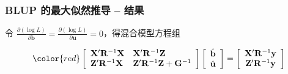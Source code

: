 \documentclass[serif,aspectratio=169]{beamer}
\begin{document}
\begin{frame}
  \frametitle{BLUP 的最大似然推导 -- 结果}
  令 $\displaystyle\frac{\partial(\log L)}{\partial\mathbf{b}}=\frac{\partial(\log L)}{\partial\mathbf{u}}=0$，得混合模型方程组

  \vspace{2em}
  
  $$
  \color{red}\left[\begin{array}{ll}
      \mathbf{X}'\mathbf{R}^{-1}\mathbf{X} & \mathbf{X}'\mathbf{R}^{-1}\mathbf{Z}\\
      \mathbf{Z}'\mathbf{R}^{-1}\mathbf{X} & \mathbf{Z}'\mathbf{R}^{-1}\mathbf{Z}+\mathbf{G}^{-1}
    \end{array}\right]
  \left[\begin{array}{cc}
      \hat{\mathbf{b}}\\
      \hat{\mathbf{u}}
    \end{array}\right] = 
  \left[\begin{array}{c}
      \mathbf{X}'\mathbf{R}^{-1}\mathbf{y}\\
      \mathbf{Z}'\mathbf{R}^{-1}\mathbf{y}
    \end{array}\right]
  $$
  
\end{frame}
\end{document}
